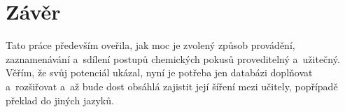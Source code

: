 \newpage
\chapter*{Závěr}

Tato práce především oveřila, jak moc je zvolený způsob provádění, zaznamenávání a~sdílení postupů chemických pokusů proveditelný a~užitečný. Věřím, že svůj potenciál ukázal, nyní je potřeba jen databázi doplňovat a~rozšiřovat a~až bude dost obsáhlá zajistit její šíření mezi učitely, popřípadě překlad do jiných jazyků.
